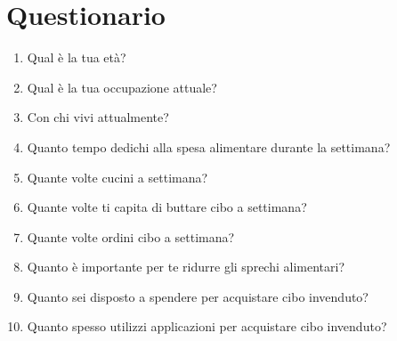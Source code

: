 \documentclass{article}
\begin{document}
\section*{Questionario}
\begin{enumerate}
    \item Qual è la tua età?
    \item Qual è la tua occupazione attuale?
    \item Con chi vivi attualmente?
    \item Quanto tempo dedichi alla spesa alimentare durante la settimana?
    \item Quante volte cucini a settimana?
    \item Quante volte ti capita di buttare cibo a settimana?
    \item Quante volte ordini cibo a settimana?
    \item Quanto è importante per te ridurre gli sprechi alimentari?
    \item Quanto sei disposto a spendere per acquistare cibo invenduto?
    \item Quanto spesso utilizzi applicazioni per acquistare cibo invenduto?
\end{enumerate}
\end{document}
